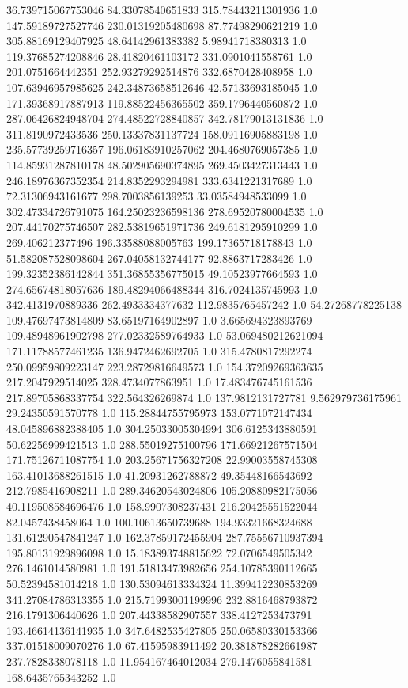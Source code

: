 36.739715067753046	84.33078540651833	315.78443211301936	1.0
147.59189727527746	230.01319205480698	87.77498290621219	1.0
305.88169129407925	48.64142961383382	5.98941718380313	1.0
119.37685274208846	28.41820461103172	331.0901041558761	1.0
201.0751664442351	252.93279292514876	332.6870428408958	1.0
107.63946957985625	242.34873658512646	42.57133693185045	1.0
171.39368917887913	119.88522456365502	359.1796440560872	1.0
287.06426824948704	274.48522728840857	342.78179013131836	1.0
311.8190972433536	250.13337831137724	158.09116905883198	1.0
235.57739259716357	196.06183910257062	204.4680769057385	1.0
114.85931287810178	48.502905690374895	269.4503427313443	1.0
246.18976367352354	214.8352293294981	333.6341221317689	1.0
72.31306943161677	298.7003856139253	33.03584948533099	1.0
302.47334726791075	164.25023236598136	278.69520780004535	1.0
207.44170275746507	282.53819651971736	249.6181295910299	1.0
269.406212377496	196.33588088005763	199.17365718178843	1.0
51.582087528098604	267.04058132744177	92.8863717283426	1.0
199.32352386142844	351.36855356775015	49.10523977664593	1.0
274.65674818057636	189.48294066488344	316.7024135745993	1.0
342.4131970889336	262.4933334377632	112.9835765457242	1.0
54.27268778225138	109.47697473814809	83.65197164902897	1.0
3.665694323893769	109.48948961902798	277.02332589764933	1.0
53.069480212621094	171.11788577461235	136.9472462692705	1.0
315.4780817292274	250.09959809223147	223.28729816649573	1.0
154.37209269363635	217.2047929514025	328.4734077863951	1.0
17.483476745161536	217.89705868337754	322.564326269874	1.0
137.9812131727781	9.562979736175961	29.24350591570778	1.0
115.28844755795973	153.0771072147434	48.045896882388405	1.0
304.25033005304994	306.6125343880591	50.62256999421513	1.0
288.55019275100796	171.66921267571504	171.75126711087754	1.0
203.25671756327208	22.99003558745308	163.41013688261515	1.0
41.20931262788872	49.35448166543692	212.7985416908211	1.0
289.34620543024806	105.20880982175056	40.119508584696476	1.0
158.9907308237431	216.20425551522044	82.0457438458064	1.0
100.10613650739688	194.93321668324688	131.61290547841247	1.0
162.37859172455904	287.75556710937394	195.80131929896098	1.0
15.183893748815622	72.0706549505342	276.1461014580981	1.0
191.51813473982656	254.10785390112665	50.52394581014218	1.0
130.53094613334324	11.399412230853269	341.27084786313355	1.0
215.71993001199996	232.8816468793872	216.1791306440626	1.0
207.44338582907557	338.4127253473791	193.46614136141935	1.0
347.6482535427805	250.06580330153366	337.01518009070276	1.0
67.41595983911492	20.381878282661987	237.7828338078118	1.0
11.954167464012034	279.1476055841581	168.6435765343252	1.0
